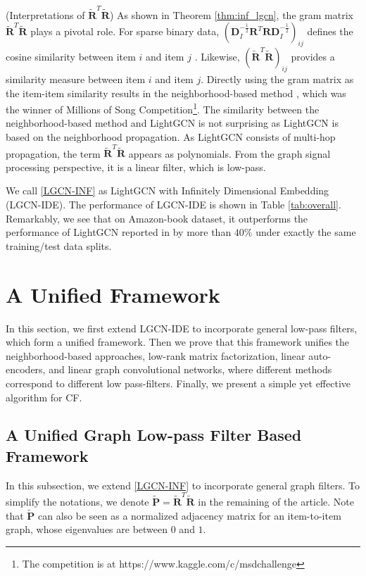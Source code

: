 \documentclass[sigconf]{acmart}
\begin{document}
\begin{remark} (Interpretations of $\tilde{\bm{R}}^T\tilde{\bm{R}}$) As shown in Theorem \ref{thm:inf_lgcn}, the gram matrix $\tilde{\bm{R}}^T\tilde{\bm{R}}$ plays a pivotal role. For sparse binary data, $(\bm{D}_I^{-\frac{1}{2}}\bm{R}^T\bm{R}\bm{D}_I^{-\frac{1}{2}})_{ij}$ defines the cosine similarity between item $i$ and item $j$ \cite{aiolli2013efficient}. Likewise, $(\tilde{\bm{R}}^T\tilde{\bm{R}})_{ij}$ provides a similarity measure between item $i$ and item $j$. Directly using the gram matrix as the item-item similarity results in the neighborhood-based method \cite{aiolli2013efficient}, which was the winner of Millions of Song Competition\footnote{The competition is at https://www.kaggle.com/c/msdchallenge}. The similarity between the neighborhood-based method and LightGCN is not surprising as LightGCN is based on the neighborhood propagation. As LightGCN consists of multi-hop propagation, the term $\tilde{\bm{R}}^T\tilde{\bm{R}}$ appears as polynomials. From the graph signal processing perspective, it is a linear filter, which is low-pass.
\end{remark}

We call \eqref{LGCN-INF} as LightGCN with Infinitely Dimensional Embedding (LGCN-IDE). The performance of LGCN-IDE is shown in Table \ref{tab:overall}. Remarkably, we see that on Amazon-book dataset, it outperforms the performance of LightGCN reported in \cite{he2020lightgcn} by more than $40\%$ under exactly the same training/test data splits.
 
\section{A Unified Framework}
\label{sec:framework}
In this section, we first extend LGCN-IDE to incorporate general low-pass filters, which form a unified framework. Then we prove that this framework unifies the neighborhood-based approaches, low-rank matrix factorization, linear auto-encoders, and linear graph convolutional networks, where different methods correspond to different low pass-filters. Finally, we present a simple yet effective algorithm for CF. 

\subsection{A Unified Graph Low-pass Filter Based Framework} 
In this subsection, we extend \eqref{LGCN-INF} to incorporate general graph filters. To simplify the notations, we denote $\tilde{\bm{P}} = \tilde{\bm{R} }^T\tilde{\bm{R} }$ in the remaining of the article. Note that $\tilde{\bm{P}}$ can also be seen as a normalized adjacency matrix for an item-to-item graph, whose eigenvalues are between $0$ and $1$. 
\end{document}
